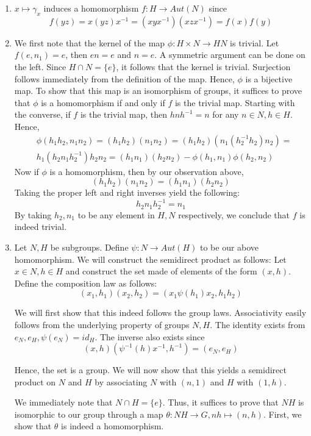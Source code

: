 \documentclass[12pt]{article}
\begin{document}
\begin{enumerate}
\item $x \mapsto \gamma_x$ induces a homomorphism $f: H \rightarrow Aut(N)$ since $$f(yz) = x(yz)x^{-1} = (xyx^{-1})(xzx^{-1}) = f(x)f(y)$$
\item 
We first note that the kernel of the map $\phi: H \times N \rightarrow HN$ is trivial. Let $f(e,n_1) = e$, then
$en = e$ and $n = e$. A symmetric argument can be done on the left. Since $H \cap N = \{e\}$, it follows that the kernel is trivial. Surjection follows immediately from the definition of the map. Hence, $\phi$ is a bijective map. To show that this map is an isomorphism of groups, it suffices to prove that $\phi$ is a homomorphism if and only if $f$ is the trivial map. Starting with the converse, if $f$ is the trivial map, then $hnh^{-1} = n$ for any $n \in N, h \in H$. Hence,
\begin{align*}
     & \phi(h_1h_2,n_1n_2) = (h_1h_2)(n_1n_2) = (h_1h_2)(n_1 (h_2^{-1}h_2) n_2) = \\
     &h_1 (h_2n_1h_2^{-1})h_2 n_2 = (h_1n_1)(h_2n_2) - \phi(h_1,n_1)\phi(h_2,n_2)
\end{align*}
Now if $\phi$ is a homomorphism, then by our observation above,
$$  (h_1h_2)(n_1n_2) = (h_1n_1)(h_2n_2)  $$
Taking the proper left and right inverses yield the following:
$$ h_2 n_1 h_2^{-1} = n_1 $$
By taking $h_2,n_1$ to be any element in $H,N$ respectively, we conclude that $f$ is indeed trivial.
\item
Let $N,H$ be subgroups. Define $\psi: N \rightarrow Aut(H)$ to be our above homomorphism. We will construct the semidirect product as follows: Let $x \in N, h \in H$ and construct the set made of elements of the form $(x,h)$. Define the composition law as follows:
$$ (x_1,h_1)(x_2,h_2) = (x_1\psi(h_1) x_2, h_1h_2)$$

We will first show that this indeed follows the group laws. Associativity easily follows from the underlying property of groups $N,H$. The identity exists from $e_N,e_H,\psi(e_N) = id_H$. The inverse also exists since $$(x,h)(\psi^{-1}(h)x^{-1},h^{-1}) = (e_N,e_H)$$

Hence, the set is a group. We will now show that this yields a semidirect product on $N$ and $H$ by associating $N$ with $(n,1)$ and $H$ with $(1,h)$. 

We immediately note that $N \cap H = \{ e\}$. Thus, it suffices to prove that $NH$ is isomorphic to our group through a map $\theta: NH \rightarrow G, nh \mapsto (n,h)$. First, we show that $\theta$ is indeed a homomorphism. 


\end{enumerate}
\end{document}
